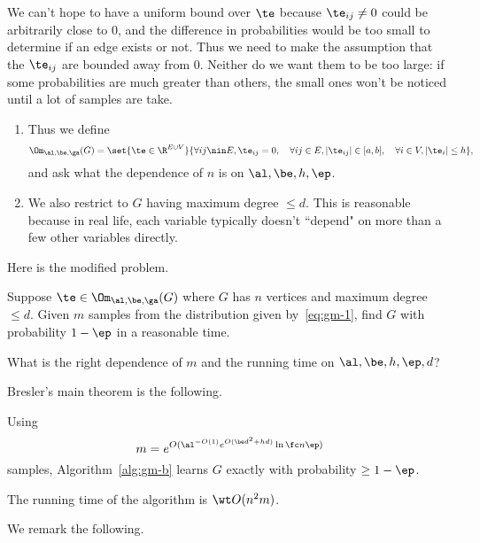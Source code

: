 We can't hope to have a uniform bound over $\te$ because $\te_{ij}\ne 0$ could be arbitrarily close to 0, and the difference in probabilities would be too small to determine if an edge exists or not. Thus we need to make the assumption that the $\te_{ij}$ are bounded away from 0. Neither do we want them to be too large: if some probabilities are much greater than others, the small ones won't be noticed until a lot of samples are take. 
\begin{enumerate}
\item
Thus we define
\[
\Om_{\al,\be,\ga}(G)=\set{\te\in \R^{E\cup V}}{\forall ij\nin E, \te_{ij}=0,\quad \forall ij\in E, |\te_{ij}|\in [a,b],\quad \forall i\in V, |\te_i|\le h},
\]
and ask what the dependence of $n$ is on $\al,\be,h,\ep$.
\item
We also restrict to $G$ having maximum degree $\le d$. This is reasonable because in real life, each variable typically doesn't ``depend" on more than a few other variables directly.
\end{enumerate}
Here is the modified problem. 
\begin{prb}
Suppose $\te \in \Om_{\al,\be,\ga}(G)$ where $G$ has $n$ vertices and maximum degree $\le d$.
Given $m$ samples from the distribution given by~\eqref{eq:gm-1}, find $G$ with probability $1-\ep$ in a reasonable time.

What is the right dependence of $m$ and the running time on $\al,\be,h,\ep,d$? 
\end{prb}
Bresler's main theorem is the following. 
\begin{thm}
Using 
\[
m=e^{O(\al^{-O(1)}e^{O(\be d^2 + h d)}\ln \fc n{\ep})} 
\]
samples, Algorithm~\ref{alg:gm-b} learns $G$ exactly with probability $\ge 1-\ep$.

The running time of the algorithm is $\wt O(n^2 m)$.
\end{thm}
We remark the following.
